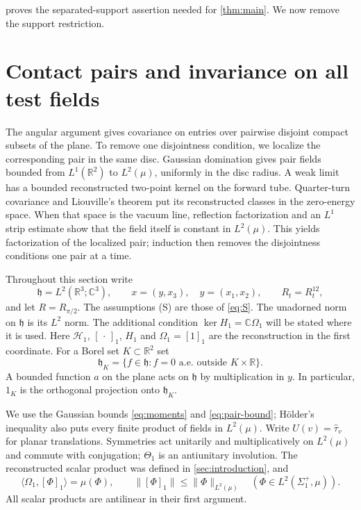 \documentclass[11pt,letterpaper,reqno]{amsart}
\theoremstyle{definition}
\theoremstyle{remark}
\newcommand{\R}{\mathbb R}\newcommand{\C}{\mathbb C}
\begin{document}
 proves the separated-support assertion
needed for \cref{thm:main}. We now remove the
support restriction.


\section{Contact pairs and invariance on all test fields}
\label{sc:section}

The angular argument gives covariance on entries over pairwise disjoint
compact subsets of the plane. To remove one disjointness condition,
we localize the corresponding pair in the same disc. Gaussian
domination gives pair fields bounded from $L^1(\R^2)$ to $L^2(\mu)$,
uniformly in the disc radius. A weak limit has a bounded reconstructed
two-point kernel on the forward tube. Quarter-turn covariance and
Liouville's theorem put its reconstructed classes in the zero-energy
space. When that space is the vacuum line, reflection factorization
and an $L^1$ strip estimate show that the field itself is constant in
$L^2(\mu)$. This yields factorization of the localized pair; induction
then removes the disjointness conditions one pair at a time.

Throughout this section write
\[
\mathfrak h=L^2(\mathbb R^3;\mathbb C^3),\qquad
x=(y,x_3),\quad y=(x_1,x_2),\qquad R_t=R^{12}_t,
\]
and let $R=R_{\pi/2}$. The assumptions (S) are those of \eqref{eq:S}. The unadorned norm on $\mathfrak h$ is its $L^2$ norm.
The additional condition $\ker H_1=\mathbb C\Omega_1$ will be stated
where it is used. Here $\mathcal H_1$, $[\,\cdot\,]_1$, $H_1$
and $\Omega_1=[1]_1$ are the reconstruction in the first coordinate.
For a Borel set $K\subset\mathbb R^2$ set
\[
\mathfrak h_K=\{f\in\mathfrak h:f=0\text{ a.e. outside }K\times\mathbb R\}.
\]
A bounded function $a$ on the plane acts on $\mathfrak h$ by multiplication
in $y$. In particular, $1_K$ is the orthogonal projection onto $\mathfrak h_K$.

We use the Gaussian bounds \eqref{eq:moments} and \eqref{eq:pair-bound};
H\"older's inequality also puts every finite product of fields in
$L^2(\mu)$. Write $U(v)=\hat\tau_v$ for planar translations.
Symmetries act unitarily and multiplicatively on $L^2(\mu)$ and
commute with conjugation; $\Theta_1$ is an antiunitary involution.
The reconstructed scalar product was defined in \cref{sec:introduction}, and
\begin{equation}\label{sc:reconstruction}
 \langle\Omega_1,[\Phi]_1\rangle=\mu(\Phi),\qquad
 \|[\Phi]_1\|\le\|\Phi\|_{L^2(\mu)}
 \quad(\Phi\in L^2(\Sigma_1^+,\mu)).
\end{equation}
All scalar products are antilinear in their first argument.
\end{document}
